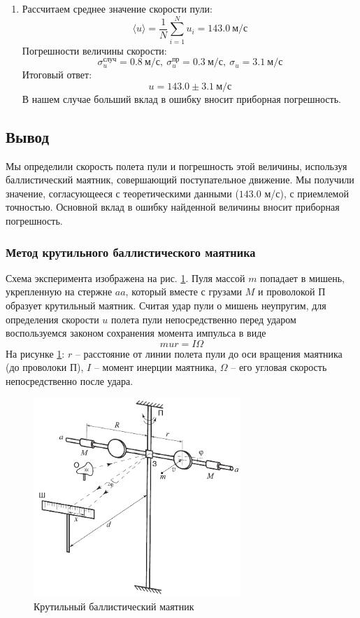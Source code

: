 \documentclass[a4paper,12pt]{article}
\begin{document}
\begin{enumerate}
    \item Рассчитаем среднее значение скорости пули:
    $$
    \langle u\rangle = \frac{1}{N}\sum_{i = 1}^{N} u_i = 143.0~\text{м/с}
    $$
    Погрешности величины скорости:
    $$
    \sigma_u^{\text{случ}} = 0.8~\text{м/с},~\sigma_u^{\text{пр}} = 0.3~\text{м/с},~\sigma_u = 3.1~\text{м/с}
    $$
    Итоговый ответ: 
    $$
    u = 143.0 \pm 3.1~\text{м/с}
    $$
    В нашем случае больший вклад в ошибку вносит приборная погрешность. 
\end{enumerate}
\subsection*{Вывод}
Мы определили скорость полета пули и погрешность этой величины, используя баллистический маятник, совершающий поступательное движение. Мы получили значение, согласующееся с теоретическими данными ($143.0$ м/с), с приемлемой точностью. Основной вклад в ошибку найденной величины вносит приборная погрешность.

\newpage

\subsubsection*{Метод крутильного баллистического маятника}

Схема эксперимента изображена на рис. \ref{3}. Пуля массой $m$ попадает в мишень, укрепленную на стержне $aa$, который вместе с грузами $M$ и проволокой П образует крутильный маятник. Считая удар пули о мишень неупругим, для определения скорости $u$ полета пули непосредственно перед ударом воспользуемся законом сохранения момента импульса в виде 
\begin{equation}
    \label{eq_I}
    mur = I\Omega
\end{equation}
На рисунке \ref{3}: $r$ -- расстояние от линии полета пули до оси вращения маятника (до проволоки П), $I$ -- момент инерции маятника, $\Omega$ -- его угловая скорость непосредственно после удара.

\begin{figure}[h]
    \centering
    \includegraphics[width=0.7\textwidth]{1.2.1 3}
    \caption{Крутильный баллистический маятник}
    \label{3}
\end{figure}
\end{document}
